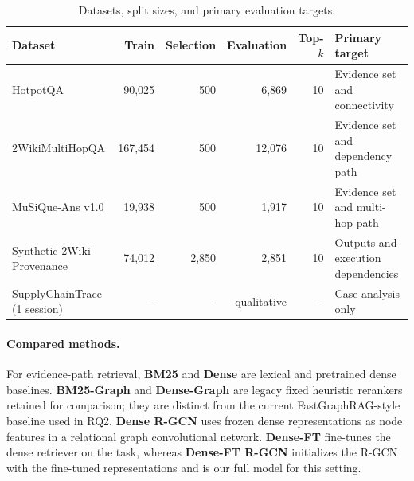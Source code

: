 \begin{table}[t]
\centering
\small
\caption{Datasets, split sizes, and primary evaluation targets.}
\label{tab:data}
\begin{tabular}{lrrrrl}
\hline
Dataset & Train & Selection & Evaluation & Top-$k$ & Primary target \\
\hline
HotpotQA & 90,025 & 500 & 6,869 & 10 & Evidence set and connectivity \\
2WikiMultiHopQA & 167,454 & 500 & 12,076 & 10 & Evidence set and dependency path \\
MuSiQue-Ans v1.0 & 19,938 & 500 & 1,917 & 10 & Evidence set and multi-hop path \\
Synthetic 2Wiki Provenance & 74,012 & 2,850 & 2,851 & 10 & Outputs and execution dependencies \\
SupplyChainTrace (1 session) & -- & -- & qualitative & -- & Case analysis only \\
\hline
\end{tabular}
\end{table}

\paragraph{Compared methods.}
For evidence-path retrieval, \textbf{BM25} and \textbf{Dense} are
lexical and pretrained dense baselines. \textbf{BM25-Graph} and
\textbf{Dense-Graph} are legacy fixed heuristic rerankers retained for
comparison; they are distinct from the current FastGraphRAG-style baseline
used in RQ2. \textbf{Dense R-GCN} uses frozen dense
representations as node features in a relational graph convolutional
network. \textbf{Dense-FT} fine-tunes the dense retriever on the task,
whereas \textbf{Dense-FT R-GCN} initializes the R-GCN with the
fine-tuned representations and is our full model for this setting.

